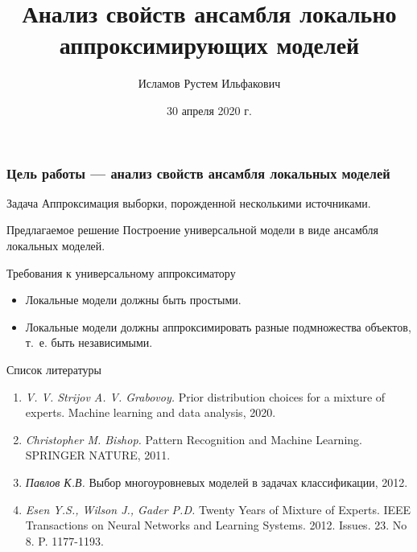 \documentclass[9pt,pdf,hyperref={unicode}]{beamer}
\title[Ансамбль локальных моделей]
{Анализ свойств ансамбля локально
аппроксимирующих моделей}
\author[Исламов Р.\ И.]{\Large Исламов Рустем Ильфакович}
\institute[]{\large Московский физико-технический институт\\
~\\

Консультант: Грабовой А.\ В.\\
Эксперт:   Стрижов В.\ В.
}
\date{30 апреля 2020 г.}
\begin{document}
\begin{frame}
\titlepage
\end{frame}



\begin{frame}
\frametitle{Цель работы --- анализ свойств ансамбля локальных моделей} 


\begin{block}{Задача}
Аппроксимация выборки, порожденной несколькими источниками.
\end{block}


\begin{block}{Предлагаемое решение}
Построение универсальной модели в виде ансамбля локальных
моделей.
\end{block}

\begin{block}{Требования к универсальному аппроксиматору}
\begin{itemize}
    \item Локальные модели должны быть простыми.
    \item Локальные модели должны аппроксимировать разные подмножества объектов, т.~е. быть независимыми.
    
\end{itemize}
\end{block}

\end{frame}

\begin{frame}{Список литературы}
	\begin{enumerate}
	\justifying
		\item \textit{V. V. Strijov A. V. Grabovoy.} Prior distribution choices for a mixture of experts. Machine learning and data analysis, 2020.
		

		\item \textit{Christopher M. Bishop.} Pattern Recognition and Machine Learning. SPRINGER NATURE, 2011.
 
		
		\item \textit{Павлов К.В.}  Выбор многоуровневых моделей в задачах классификации, 2012.
		
		\item \textit{Esen Y.S., Wilson J., Gader P.D.}  Twenty Years of Mixture of Experts. IEEE Transactions on Neural Networks and Learning Systems. 2012. Issues. 23. No 8. P. 1177-1193.
		
	\end{enumerate}
\end{frame}
\end{document}
